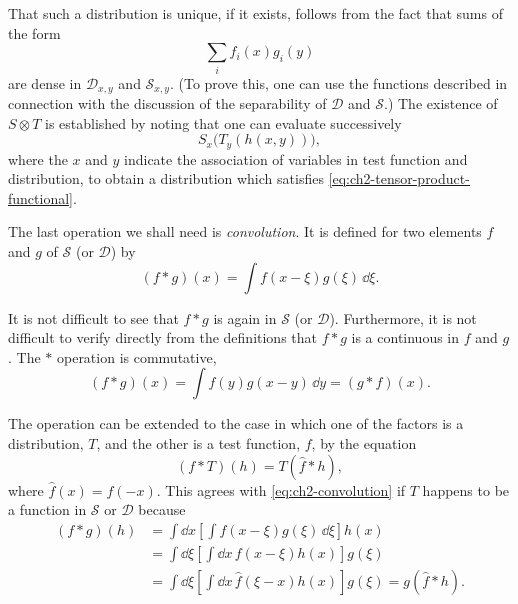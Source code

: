 That such a distribution is unique, if it exists, follows from the fact that
sums of the form
\begin{equation*}
  \sum_i f_i(x)g_i(y)
\end{equation*}
are dense in $\mathcal{D}_{x,y}$ and $\mathcal{S}_{x,y}$. (To prove this, one
can use the functions described in connection with the discussion of the
separability of $\mathcal{D}$ and $\mathcal{S}$.) The existence of $S\otimes T$
is established by noting that one can evaluate successively
\begin{equation}
  S_x\bigl(T_y(h(x,y))\bigr),
\tag{2-28}\label{eq:ch2-tensor-product-successive}
\end{equation}
where the $x$ and $y$ indicate the association of variables in test function
and distribution, to obtain a distribution which satisfies \eqref{eq:ch2-tensor-product-functional}.

The last operation we shall need is \emph{convolution}. It is defined for two
elements $f$ and $g$ of $\mathcal{S}$ (or $\mathcal{D}$) by
\begin{equation}
  (f*g)(x)=\int f(x-\xi)g(\xi)\,\dd\xi.
\tag{2-29}\label{eq:ch2-convolution}
\end{equation}

It is not difficult to see that $f*g$ is again in $\mathcal{S}$ (or
$\mathcal{D}$). Furthermore, it is not difficult to verify directly from the
definitions that $f*g$ is a continuous in $f$ and $g$. The $*$ operation is
commutative,
\begin{equation}
  (f*g)(x)=\int f(y)g(x-y)\,\dd y=(g*f)(x).
\tag{2-30}\label{eq:ch2-convolution-commutative}
\end{equation}

The operation can be extended to the case in which one of the factors is a
distribution, $T$, and the other is a test function, $f$, by the equation
\begin{equation}
  (f*T)(h)=T(\widehat{f}*h),
\tag{2-31}\label{eq:ch2-distribution-convolution}
\end{equation}
where $\widehat{f}(x)=f(-x)$. This agrees with \eqref{eq:ch2-convolution} if $T$ happens to be a
function in $\mathcal{S}$ or $\mathcal{D}$ because
\begin{equation*}
\begin{aligned}
  (f*g)(h)&=\int \dd x\left[\int f(x-\xi)g(\xi)\,\dd\xi\right]h(x)\\
    &=\int \dd\xi\left[\int \dd x\,f(x-\xi)h(x)\right]g(\xi)\\
    &=\int \dd\xi\left[\int \dd x\,\widehat{f}(\xi-x)h(x)\right]g(\xi)
      =g(\widehat{f}*h).
\end{aligned}
\end{equation*}

